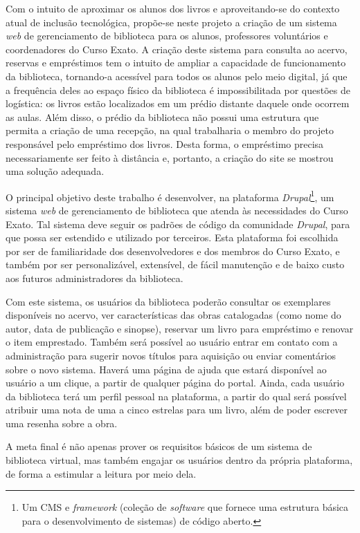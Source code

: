 \documentclass[a4paper]{article}
\begin{document}
Com o intuito de aproximar os alunos dos livros e aproveitando-se do contexto atual de inclusão tecnológica, propõe-se neste projeto a criação de um sistema \textit{web} de gerenciamento de biblioteca para os alunos, professores voluntários e coordenadores do Curso Exato. A criação deste sistema para consulta ao acervo, reservas e empréstimos tem o intuito de ampliar a capacidade de funcionamento da biblioteca, tornando-a acessível para todos os alunos pelo meio digital, já que a frequência deles ao espaço físico da biblioteca é impossibilitada por questões de logística: os livros estão localizados em um prédio distante daquele onde ocorrem as aulas. Além disso, o prédio da biblioteca não possui uma estrutura que permita a criação de uma recepção, na qual trabalharia o membro do projeto responsável pelo empréstimo dos livros. Desta forma, o empréstimo precisa necessariamente ser feito à distância e, portanto, a criação do site se mostrou uma solução adequada.

O principal objetivo deste trabalho é desenvolver, na plataforma \textit{Drupal}\footnote{Um CMS e \textit{framework} (coleção de \textit{software} que fornece uma estrutura básica para o desenvolvimento de sistemas) de código aberto.}, um sistema \textit{web} de gerenciamento de biblioteca que atenda às necessidades do Curso Exato. Tal sistema deve seguir os padrões de código da comunidade \textit{Drupal}, para que possa ser estendido e utilizado por terceiros. Esta plataforma foi escolhida por ser de familiaridade dos desenvolvedores e dos membros do Curso Exato, e também por ser personalizável, extensível, de fácil manutenção e de baixo custo aos futuros administradores da biblioteca.

Com este sistema, os usuários da biblioteca poderão consultar os exemplares disponíveis no acervo, ver características das obras catalogadas (como nome do autor, data de publicação e sinopse), reservar um livro para empréstimo e renovar o item emprestado. Também será possível ao usuário entrar em contato com a administração para sugerir novos títulos para aquisição ou enviar comentários sobre o novo sistema. Haverá uma página de ajuda que estará disponível ao usuário a um clique, a partir de qualquer página do portal. Ainda, cada usuário da biblioteca terá um perfil pessoal na plataforma, a partir do qual será possível atribuir uma nota de uma a cinco estrelas para um livro, além de poder escrever uma resenha sobre a obra.

A meta final é não apenas prover os requisitos básicos de um sistema de biblioteca virtual, mas também engajar os usuários dentro da própria plataforma, de forma a estimular a leitura por meio dela.
\end{document}
